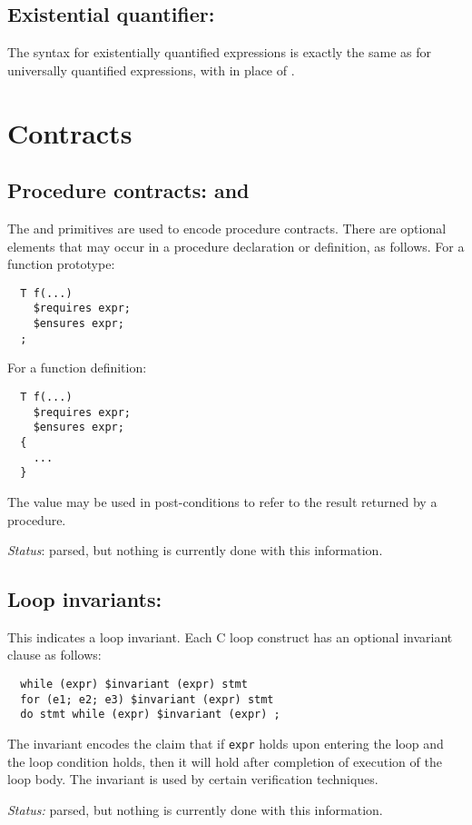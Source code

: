 \subsection{Existential quantifier: \cexists}

The syntax for existentially quantified expressions is exactly the
same as for universally quantified expressions, with \cexists{} in
place of \cforall{}.

\section{Contracts}

\subsection{Procedure contracts: \crequires{} and \censures{}}
The \crequires{} and \censures{} primitives are used to encode
procedure contracts.  There are optional
elements that may occur in a procedure declaration or definition,
as follows.  For a function prototype:
\begin{verbatim}
  T f(...)
    $requires expr;
    $ensures expr;
  ;
\end{verbatim}
For a function definition:
\begin{verbatim}
  T f(...)
    $requires expr;
    $ensures expr;
  {
    ...
  }
\end{verbatim}
The value \cresult{} may be used in post-conditions to refer
to the result returned by a procedure.

\emph{Status}: parsed, but nothing is currently done with this
information.

\subsection{Loop invariants: \cinvariant}

This indicates a loop invariant.  Each C loop
construct has an optional invariant clause as follows:
\begin{verbatim}
  while (expr) $invariant (expr) stmt
  for (e1; e2; e3) $invariant (expr) stmt
  do stmt while (expr) $invariant (expr) ;
\end{verbatim}
The invariant encodes the claim that if \texttt{expr} holds upon
entering the loop and the loop condition holds, then it will hold
after completion of execution of the loop body.  The invariant is used
by certain verification techniques.

\emph{Status:} parsed, but nothing is currently done with this
information.

